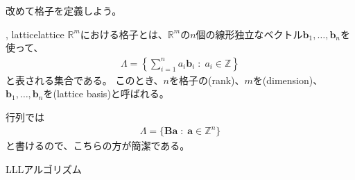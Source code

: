 改めて格子を定義しよう。

\begin{Defi}{, lattice}{lattice}
$\mathbb{R}^m$における格子とは、$\mathbb{R}^m$の$n$個の線形独立なベクトル$\mathbf{b}_1, \ldots,\mathbf{b}_n$を使って、
\begin{align*}
\Lambda = \left\{ \sum_{i=1}^n a_i \mathbf{b}_i \; : \; a_i \in\mathbb{Z} \right\}
\end{align*}
と表される集合である。
このとき、$n$を格子の(rank)、$m$を(dimension)、$\mathbf{b}_1, \ldots,\mathbf{b}_n$を(lattice basis)と呼ばれる。
\end{Defi}

行列では
\begin{align*}
\Lambda = \{ \mathbf{Ba} \; : \; \mathbf{a} \in \mathbb{Z}^n\}
\end{align*}
と書けるので、こちらの方が簡潔である。

LLLアルゴリズム\cite{10.1007/BF01457454}


